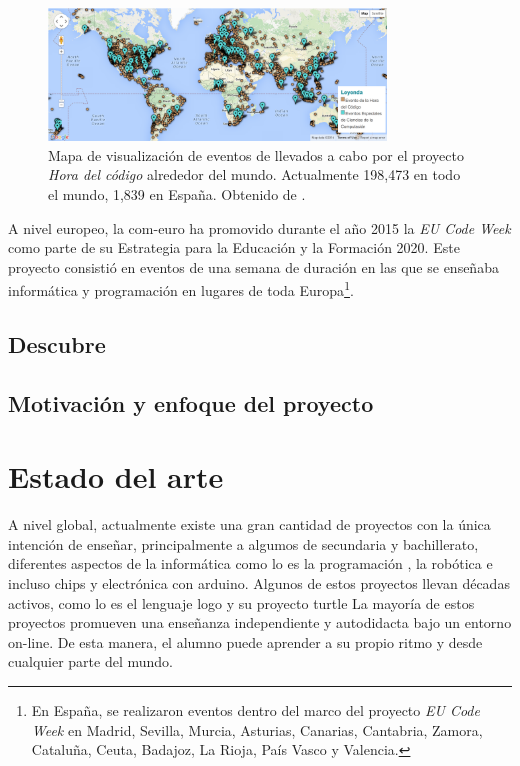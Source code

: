 \begin{figure}[!ht]
	\begin{centering}
		\includegraphics[width=0.8\textwidth]{images/map-hour-code.png}
			\caption{Mapa de visualización de eventos de llevados a cabo por el proyecto \emph{Hora del código} alrededor del mundo. Actualmente 198,473 en todo el mundo, 1,839 en España. Obtenido de \cite{hour-of-code}.}
				\label{fig:map-hour-code}
	\end{centering}
\end{figure}


A nivel europeo, la \Gls{com-euro}{\color{red}\cite{ec-code-week}} ha promovido durante el año 2015 la \emph{EU Code Week}{\color{red}\cite{code-week}} como parte de su Estrategia para la Educación y la Formación 2020. Este proyecto consistió en eventos de una semana de duración en las que se enseñaba informática y programación en lugares de toda Europa\footnote{En España, se realizaron eventos dentro del marco del proyecto \emph{EU Code Week} en Madrid, Sevilla, Murcia, Asturias, Canarias, Cantabria, Zamora, Cataluña, Ceuta, Badajoz, La Rioja, País Vasco y Valencia.}.



\section{Descubre}
\label{sec:descubre}


\section{Motivación y enfoque del proyecto}
\label{sec:motivacion}


\chapter{Estado del arte}\label{estado-arte}



A nivel global, actualmente existe una gran cantidad de proyectos con la única intención de enseñar, principalmente a algumos de secundaria y bachillerato, diferentes aspectos de la informática como lo es la programación \cite{code-school,code-org,code-academy}, la robótica \cite{robomind-web,moway} e incluso chips y electrónica con \Gls{arduino}\cite{arduino}. Algunos de estos proyectos llevan décadas activos, como lo es el lenguaje \Gls{logo}\cite{logo} y su proyecto \Gls{turtle}\cite{logo-turtle}
La mayoría de estos proyectos promueven una enseñanza independiente y autodidacta bajo un entorno on-line. De esta manera, el alumno puede aprender a su propio ritmo y desde cualquier parte del mundo.


